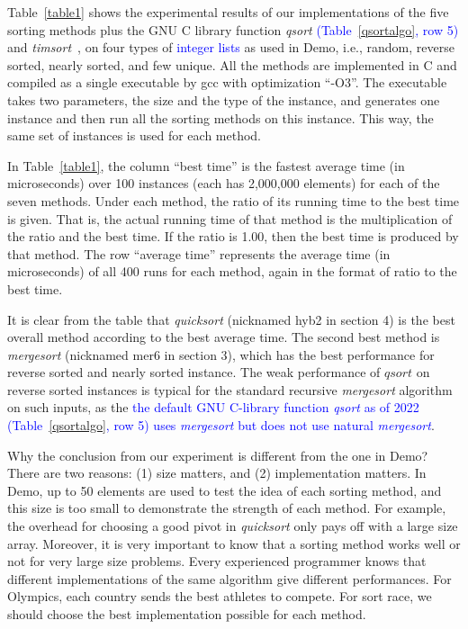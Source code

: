 \documentclass[AMA,STIX1COL]{WileyNJD-v2}
\newcommand{\qusort}{\emph{quicksort }}
\newcommand{\qsort}{\emph{qsort }}
\newcommand{\tsortn}{\emph{timsort}}
\newcommand{\msort}{\emph{mergesort }}
\begin{document}
Table~\ref{table1} shows the experimental results of our implementations of the five sorting methods plus the GNU C library function \qsort \textcolor{blue}{(Table~\ref{qsortalgo}, row 5)} and \tsortn~\cite{timsort}, on four types of \textcolor{blue}{integer lists} as used in Demo, i.e., random, reverse sorted, nearly sorted, and few unique. 
All the methods are implemented in C and compiled as a single executable by gcc with optimization “-O3”. 
The executable takes two parameters, the size and the type of the instance, and generates one instance and then run all the sorting methods on this instance. 
This way, the same set of instances is used for each method.

In Table~\ref{table1}, the column “best time” is the fastest average time (in microseconds) over 100 instances (each has 2,000,000 elements) for each of the seven methods.  
Under each method, the ratio of its running time to the best time is given. 
That is, the actual running time of that method is the multiplication of the ratio and the best time. 
If the ratio is 1.00, then the best time is produced by that method. 
The row “average time” represents the average time (in microseconds) of all 400 runs for each method, again in the format of ratio to the best time.

It is clear from the table that \qusort (nicknamed hyb2 in section 4) is the best overall method according to the best average time. 
The second best method is \msort (nicknamed mer6 in section 3), which has the best performance for reverse sorted and nearly sorted instance. 
The weak performance of $qsort$ on reverse sorted instances is typical for the standard recursive \msort algorithm on such inputs, as the \textcolor{blue}{the default GNU C-library function \qsort as of 2022 (Table~\ref{qsortalgo}, row 5) uses \emph{mergesort} but does not use natural \emph{mergesort}}.


Why the conclusion from our experiment is different from the one in Demo? 
There are two reasons: (1) size matters, and (2) implementation matters. 
In Demo, up to 50 elements are used to test the idea of each sorting method, and this size is too small to demonstrate the strength of each method. 
For example, the overhead for choosing a good pivot in \qusort only pays off with a large size array. 
Moreover, it is very important to know that a sorting method works well or not for very large size problems. 
Every experienced programmer knows that different implementations of the same algorithm give different performances. 
For Olympics, each country sends the best athletes to compete. 
For sort race, we should choose the best implementation possible for each method.
\end{document}
